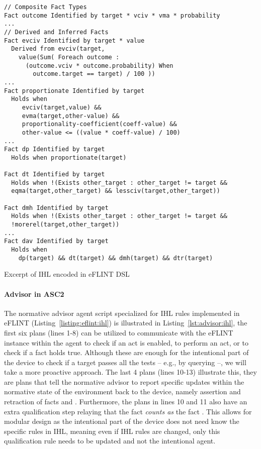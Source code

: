 \begin{listing}[t]
\centering
\begin{tcolorbox}[left=2pt,right=2pt,top=2pt,bottom=2pt,arc=0pt,
                  boxrule=0pt,toprule=1pt,
                  colback=white]
\begin{verbatim}
// Composite Fact Types
Fact outcome Identified by target * vciv * vma * probability
...
// Derived and Inferred Facts
Fact evciv Identified by target * value
  Derived from evciv(target, 
    value(Sum( Foreach outcome : 
      (outcome.vciv * outcome.probability) When 
        outcome.target == target) / 100 ))
...
Fact proportionate Identified by target
  Holds when
     evciv(target,value) &&
     evma(target,other-value) &&
     proportionality-coefficient(coeff-value) &&
     other-value <= ((value * coeff-value) / 100)
...
Fact dp Identified by target
  Holds when proportionate(target)
  
Fact dt Identified by target
  Holds when !(Exists other_target : other_target != target &&
  eqma(target,other_target) && lessciv(target,other_target))

Fact dmh Identified by target
  Holds when !(Exists other_target : other_target != target &&
  !morerel(target,other_target))
...  
Fact dav Identified by target
  Holds when 
    dp(target) && dt(target) && dmh(target) && dtr(target)
\end{verbatim}
\end{tcolorbox}
\caption{Excerpt of IHL encoded in eFLINT DSL}
\label{listing:eflint:ihl}
\end{listing}

\paragraph{Advisor in ASC2}
The normative advisor agent script specialized for IHL rules implemented in eFLINT (Listing~\ref{listing:eflint:ihl}) is illustrated in Listing~\ref{lst:advisor:ihl}, the first six plans (lines 1-8) can be utilized to communicate with the eFLINT instance within the agent to check if an act is enabled, to perform an act, or to check if a fact holds true. Although these are enough for the intentional part of the device to check if a target passes all the tests -- e.g., by querying --, we will take a more proactive approach. The last 4 plans (lines 10-13) illustrate this, they are plans that tell the normative advisor to report specific updates within the normative state of the environment back to the device, namely assertion and retraction of facts  and . Furthermore, the plans in lines 10 and 11 also have an extra qualification step relaying that the fact  \textit{counts as} the fact . This allows for modular design as the intentional part of the device does not need know the specific rules in IHL, meaning even if IHL rules are changed, only this qualification rule needs to be updated and not the intentional agent.

